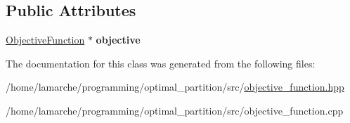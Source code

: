 \subsection*{Public Attributes}
\begin{DoxyCompactItemize}
\item 
\hypertarget{classObjectiveValue_a12509b8168294b3b1a76ec092dd48a3a}{\hyperlink{classObjectiveFunction}{Objective\-Function} $\ast$ {\bfseries objective}}\label{classObjectiveValue_a12509b8168294b3b1a76ec092dd48a3a}

\end{DoxyCompactItemize}


The documentation for this class was generated from the following files\-:\begin{DoxyCompactItemize}
\item 
/home/lamarche/programming/optimal\-\_\-partition/src/\hyperlink{objective__function_8hpp}{objective\-\_\-function.\-hpp}\item 
/home/lamarche/programming/optimal\-\_\-partition/src/objective\-\_\-function.\-cpp\end{DoxyCompactItemize}

